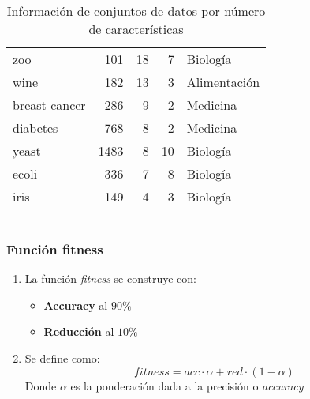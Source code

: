 \begin{frame}
\begin{columns}
\begin{table}[htp]
\begin{tabular}{ l r r r l }
        zoo              & 101            & 18            & 7             & Biología      \\
        wine             & 182            & 13            & 3             & Alimentación  \\
        breast-cancer    & 286            & 9             & 2             & Medicina      \\
        diabetes         & 768            & 8             & 2             & Medicina      \\
        yeast            & 1483           & 8             & 10            & Biología      \\
        ecoli            & 336            & 7             & 8             & Biología      \\
        iris             & 149            & 4             & 3             & Biología      \\ \hline
      \end{tabular}
      \caption{Información de conjuntos de datos por número de características}
      \label{tab:datasets_info}
    \end{table}
  \end{columns}
\end{frame}

\begin{frame}
  \frametitle{Función fitness}
  \begin{enumerate}
    \item La función \textit{fitness} se construye con:
          \begin{itemize}
            \item \textbf{Accuracy} al $90\%$
            \item \textbf{Reducción} al $10\%$
          \end{itemize}
    \item Se define como: \begin{equation}
            fitness = acc\cdot\alpha + red\cdot(1-\alpha)
            \label{eq:fitness}
          \end{equation}
          Donde $\alpha$ es la ponderación dada a la precisión o \textit{accuracy}
  \end{enumerate}
\end{frame}


